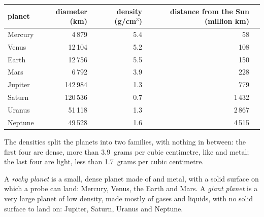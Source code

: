 \begin{center}
\small
\begin{tabular}{lrrrr}
\hline
planet & diameter (km) & density (g/cm$^3$) & distance from the Sun (million km)\\
\hline
Mercury & 4\,879 & 5.4 & 58\\
Venus & 12\,104 & 5.2 & 108\\
Earth & 12\,756 & 5.5 & 150\\
Mars & 6\,792 & 3.9 & 228\\
\hline
Jupiter & 142\,984 & 1.3 & 779\\
Saturn & 120\,536 & 0.7 & 1\,432\\
Uranus & 51\,118 & 1.3 & 2\,867\\
Neptune & 49\,528 & 1.6 & 4\,515\\
\hline
\end{tabular}
\end{center}

The densities split the planets into two families, with nothing in between:
the first four are dense, more than 3.9~grams per cubic centimetre, like
 and metal; the last four are light, less than 1.7~grams per cubic
centimetre.

\begin{definition}\label{def:g6:earth-a-planet:planet-types}
A \emph{rocky planet} is a small, dense planet made of
 and metal, with a solid surface on which a probe can land: Mercury,
Venus, the Earth and Mars. A \emph{giant planet} is a
very large planet of low density, made mostly of gases and liquids, with no
solid surface to land on: Jupiter, Saturn, Uranus and Neptune.
\end{definition}

